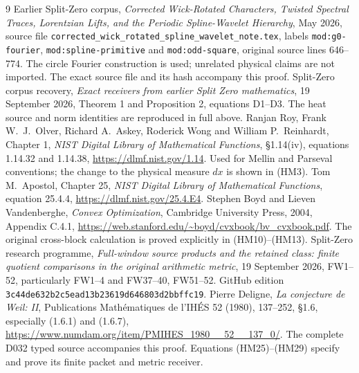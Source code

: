 \documentclass[11pt]{article}
\begin{document}
\begin{thebibliography}{9}
\small
{} Earlier Split-Zero corpus,
\emph{Corrected Wick-Rotated Characters, Twisted Spectral Traces,
Lorentzian Lifts, and the Periodic Spline-Wavelet Hierarchy}, May 2026,
source file
\texttt{corrected\_wick\_rotated\_spline\_wavelet\_note.tex},
labels \texttt{mod:g0-fourier}, \texttt{mod:spline-primitive} and
\texttt{mod:odd-square}, original source lines 646--774.
The circle Fourier construction is used; unrelated physical claims are
not imported. The exact source file and its hash accompany this proof.
 Split-Zero corpus recovery,
\emph{Exact receivers from earlier Split Zero mathematics},
19 September 2026, Theorem 1 and Proposition 2, equations D1--D3.
The heat source and norm identities are reproduced in full above.
 Ranjan Roy, Frank W.~J.~Olver, Richard A.~Askey,
Roderick Wong and William P.~Reinhardt, Chapter 1,
\emph{NIST Digital Library of Mathematical Functions},
\S1.14(iv), equations 1.14.32 and 1.14.38,
\url{https://dlmf.nist.gov/1.14}.
Used for Mellin and Parseval conventions; the change to the physical
measure $dx$ is shown in (HM3).
 Tom M.~Apostol, Chapter 25,
\emph{NIST Digital Library of Mathematical Functions}, equation 25.4.4,
\url{https://dlmf.nist.gov/25.4.E4}.
 Stephen Boyd and Lieven Vandenberghe,
\emph{Convex Optimization}, Cambridge University Press, 2004,
Appendix C.4.1,
\url{https://web.stanford.edu/~boyd/cvxbook/bv_cvxbook.pdf}.
The original cross-block calculation is proved explicitly in (HM10)--(HM13).
 Split-Zero research programme,
\emph{Full-window source products and the retained class: finite quotient
comparisons in the original arithmetic metric}, 19 September 2026,
FW1--52, particularly FW1--4 and FW37--40, FW51--52.
GitHub edition \texttt{3c44de632b2c5ead13b23619d646803d2bbffc19}.
 Pierre Deligne, \emph{La conjecture de Weil: II},
Publications Math\'ematiques de l'IH\'ES 52 (1980), 137--252,
\S1.6, especially (1.6.1) and (1.6.7),
\url{https://www.numdam.org/item/PMIHES_1980__52__137_0/}.
The complete D032 typed source accompanies this proof. Equations
(HM25)--(HM29) specify and prove its finite packet and metric receiver.
\end{thebibliography}
\end{document}
